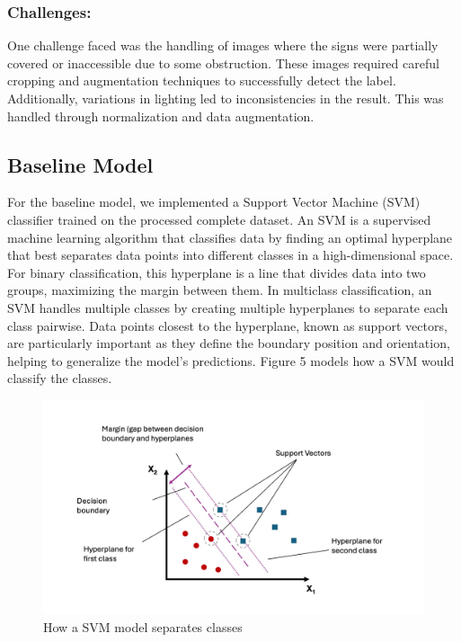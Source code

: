 \documentclass{article} %
\begin{document}
\subsubsection{Challenges:}
One challenge faced was the handling of images where the signs were partially covered or inaccessible due to some obstruction. These images required careful cropping and augmentation techniques to successfully detect the label. Additionally, variations in lighting led to inconsistencies in the result. This was handled through normalization and data augmentation. 

\subsection{Baseline Model}
For the baseline model, we implemented a Support Vector Machine (SVM) classifier trained on the processed complete dataset.
An SVM is a supervised machine learning algorithm that classifies data by finding an optimal hyperplane that best separates data points into different classes in a high-dimensional space. For binary classification, this hyperplane is a line that divides data into two groups, maximizing the margin between them. In multiclass classification, an SVM handles multiple classes by creating multiple hyperplanes to separate each class pairwise. Data points closest to the hyperplane, known as support vectors, are particularly important as they define the boundary position and orientation, helping to generalize the model’s predictions\citep{yue2003svm}. Figure 5 models how a SVM would classify the classes.

\newpage
\label{gen_inst}
\begin{figure}[h]
\begin{center}
\includegraphics[width=\textwidth]{Figs/Figure_1_for_baseline.jpg}
\end{center}
\caption{How a SVM model separates classes}
\end{figure}
\end{document}
